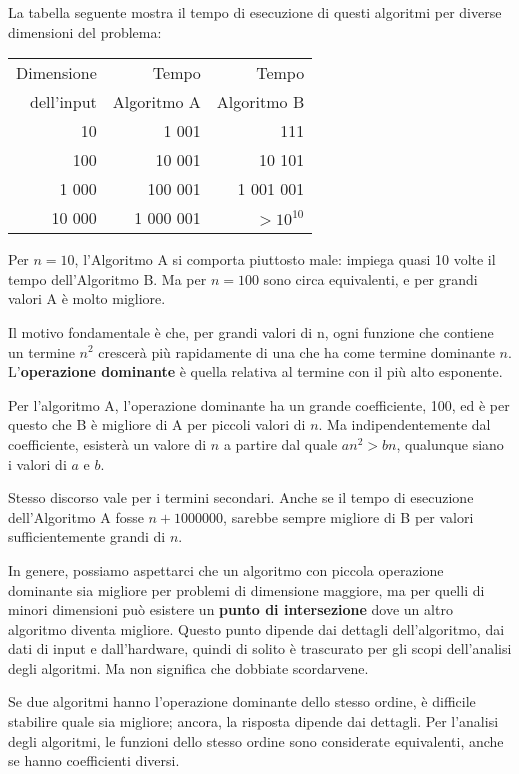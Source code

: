 \documentclass[10pt]{book}
\begin{document}
La tabella seguente mostra il tempo di esecuzione di questi algoritmi per diverse dimensioni del problema:

\begin{tabular}{|r|r|r|}
\hline
Dimensione &   Tempo          & Tempo \\
dell'input	   &   Algoritmo A    & Algoritmo B \\
\hline
10        &   1 001           & 111         \\
100       &   10 001          & 10 101         \\
1 000     &   100 001         & 1 001 001         \\
10 000    &   1 000 001       & $> 10^{10}$         \\
\hline
\end{tabular}

Per $n=10$, l'Algoritmo A si comporta piuttosto male: impiega quasi 10 volte il tempo dell'Algoritmo B.  Ma per $n=100$ sono circa equivalenti, e per grandi valori A è molto migliore.

Il motivo fondamentale è che, per grandi valori di n, ogni funzione che contiene un termine $n^2$ crescerà più rapidamente di una che ha come termine dominante $n$. L'{\bf operazione dominante} è quella relativa al termine con il più alto esponente.

Per l'algoritmo A, l'operazione dominante ha un grande coefficiente, 100, ed è per questo che B è migliore di A per piccoli valori di $n$.  Ma indipendentemente dal coefficiente, esisterà un valore di $n$ a partire dal quale
$a n^2 > b n$, qualunque siano i valori di $a$ e $b$.

Stesso discorso vale per i termini secondari. Anche se il tempo di esecuzione dell'Algoritmo A fosse $n+1000000$, sarebbe sempre migliore di B per valori sufficientemente grandi di $n$.

In genere, possiamo aspettarci che un algoritmo con piccola operazione dominante sia migliore per problemi di dimensione maggiore, ma per quelli di minori dimensioni può esistere un {\bf punto di intersezione} dove un altro algoritmo diventa migliore. Questo punto dipende dai dettagli dell'algoritmo, dai dati di input e dall'hardware, quindi di solito è trascurato per gli scopi dell'analisi degli algoritmi. Ma non significa che dobbiate scordarvene.

Se due algoritmi hanno l'operazione dominante dello stesso ordine, è difficile stabilire quale sia migliore; ancora, la risposta dipende dai dettagli. Per l'analisi degli algoritmi, le funzioni dello stesso ordine sono considerate equivalenti, anche se hanno coefficienti diversi.
\end{document}

